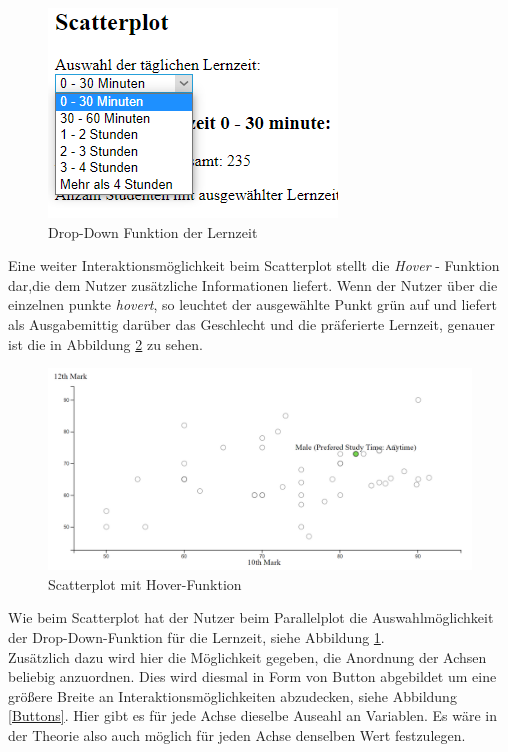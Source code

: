 \documentclass[usegeometry=true]{scrartcl}
\begin{document}
\begin{figure}[h]
\begin{center}
	\includegraphics[scale=.75]{ScatterZeitDrop.png}
	\caption{Drop-Down Funktion der Lernzeit}
	\label{TimeDrop}
\end{center}
\end{figure}

\noindent Eine weiter Interaktionsmöglichkeit beim Scatterplot stellt die \textit{Hover} - Funktion dar,die dem Nutzer zusätzliche Informationen liefert. Wenn der Nutzer über die einzelnen punkte \textit{hovert}, so leuchtet der ausgewählte Punkt grün auf und liefert als \glqq Ausgabe\grqq mittig darüber das Geschlecht und die präferierte Lernzeit, genauer ist die in Abbildung \ref{ScatterAnw} zu sehen.

\begin{figure}[h]
\begin{center}
	\includegraphics[scale=.25]{ScatterAnw.png}
	\caption{Scatterplot mit Hover-Funktion}
	\label{ScatterAnw}
\end{center}
\end{figure}

\noindent Wie beim Scatterplot hat der Nutzer beim Parallelplot die Auswahlmöglichkeit der Drop-Down-Funktion für die Lernzeit, siehe Abbildung \ref{TimeDrop}.\\
Zusätzlich dazu wird hier die Möglichkeit gegeben, die Anordnung der Achsen beliebig anzuordnen. Dies wird diesmal in Form von Button abgebildet um eine größere Breite an Interaktionsmöglichkeiten abzudecken, siehe Abbildung \ref{Buttons}. Hier gibt es für jede Achse dieselbe Auseahl an Variablen. Es wäre in der Theorie also auch möglich für jeden Achse denselben Wert festzulegen.
\end{document}

